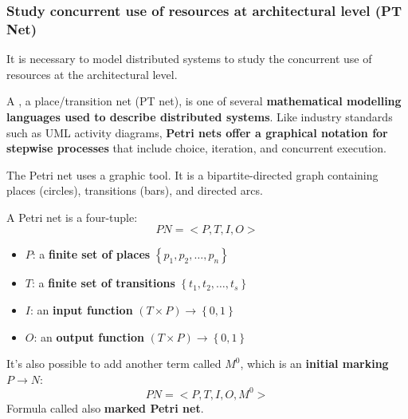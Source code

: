\subsubsection{Study concurrent use of resources at architectural level (PT Net)}\label{subsubsection: study concurrent use of resources at architectural level (PT Net)}

It is necessary to model distributed systems to study the concurrent use of resources at the architectural level.

\highspace
A , a place/transition net (PT net), is one of several \textbf{mathematical modelling languages used to describe distributed systems}. Like industry standards such as UML activity diagrams, \textbf{Petri nets offer a graphical notation for stepwise processes} that include choice, iteration, and concurrent execution.

\highspace
The Petri net uses a graphic tool. It is a bipartite-directed graph containing places (circles), transitions (bars), and directed arcs.

\highspace
A Petri net is a four-tuple:
\begin{equation}
    PN = <P, T, I, O>
\end{equation}
\begin{itemize}
    \item $P$: a \textbf{finite set of places} $\left\{p_{1}, p_{2}, \dots, p_{n}\right\}$
    
    \item $T$: a \textbf{finite set of transitions} $\left\{t_{1}, t_{2}, \dots, t_{s}\right\}$
    
    \item $I$: an \textbf{input function} $\left(T \times P\right) \longrightarrow \left\{0,1\right\}$
    
    \item $O$: an \textbf{output function} $\left(T \times P\right) \longrightarrow \left\{0,1\right\}$
\end{itemize}
It's also possible to add another term called $M^{0}$, which is an \textbf{initial marking} $P \longrightarrow N$:
\begin{equation}
    PN = <P, T, I, O, M^{0}>
\end{equation}
Formula called also \textbf{marked Petri net}.

